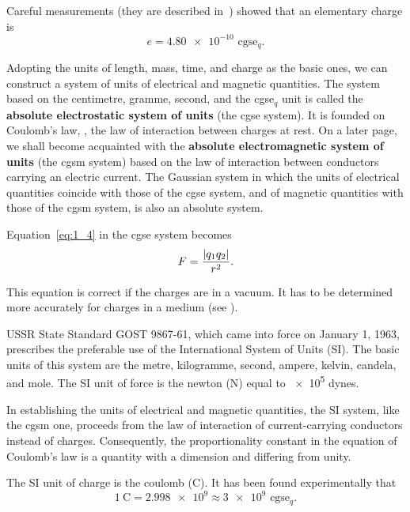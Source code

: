 Careful measurements (they are described in~) showed that an elementary charge is
\begin{equation}\label{eq:1_6}
	e = \num{4.80e-10}\text{ cgse$_q$}.
\end{equation}

Adopting the units of length, mass, time, and charge as the basic ones, we can construct a system of units of electrical and magnetic quantities. The system based on the centimetre, gramme, second, and the cgse$_q$ unit is called the \textbf{absolute electrostatic system of units} (the cgse system). It is founded on Coulomb's law, \ie, the law of interaction between charges at rest. On a later page, we shall become acquainted with the \textbf{absolute electromagnetic system of units} (the cgsm system) based on the law of interaction between conductors carrying an electric current. The Gaussian system in which the units of electrical quantities coincide with those of the cgse system, and of magnetic quantities with those of the cgsm system, is also an absolute system.

Equation~\eqref{eq:1_4} in the cgse system becomes
\begin{equation}\label{eq:1_7}
	F = \frac{\left| q_1 q_2 \right|}{r^2}.
\end{equation}

\noindent
This equation is correct if the charges are in a vacuum. It has to be determined more accurately for charges in a medium (see ).

USSR State Standard GOST 9867-61, which came into force on January 1, 1963, prescribes the preferable use of the International System of Units (SI). The basic units of this system are the metre, kilogramme, second, ampere, kelvin, candela, and mole. The SI unit of force is the newton (\si{\newton}) equal to \num{e5} dynes.

In establishing the units of electrical and magnetic quantities, the SI system, like the cgsm one, proceeds from the law of interaction of current-carrying conductors instead of charges. Consequently, the proportionality constant in the equation of Coulomb's law is a quantity with a dimension and differing from unity.

The SI unit of charge is the coulomb (\si{\coulomb}). It has been found experimentally that
\vspace{-12pt}
\begin{equation}\label{eq:1_8}
	\SI{1}{\coulomb} = \num{2.998e9} \approx \num{3e9}{\text{ cgse$_q$}}.
\end{equation}

